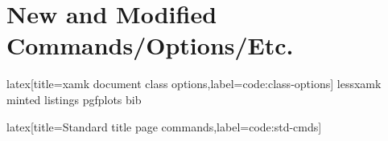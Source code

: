 \section{New and Modified Commands/Options/Etc.}

\begin{code}{latex}[title={xamk document class options},label=code:class-options]
lessxamk
minted
listings
pgfplots
bib
\end{code}
%
\begin{code}[firstnumber=last]{latex}[title={Standard title page commands},label=code:std-cmds]
\maketitle
\end{code}
%
